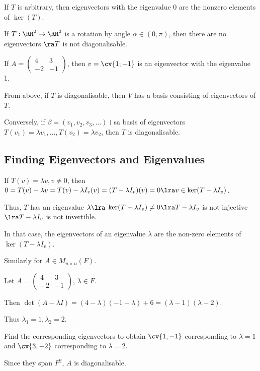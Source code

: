 \documentclass[11pt]{scrartcl}
\begin{document}
\begin{example}
  If \(T\) is arbitrary, then eigenvectors with the eigenvalue 0 are the nonzero elements of \(\ker(T)\).
\end{example}
\begin{example}
  If \(T: \RR^{2} \to \RR^{2}\) is a rotation by angle
  \(\alpha\in (0, \pi)\), then there are no eigenvectors \(\ra T\) is
  not diagonalisable.
\end{example}
\begin{example}
  If \(A = \begin{pmatrix}
    4 & 3\\
    -2 & -1
  \end{pmatrix}\), then \(v=\cv{1; -1}\) is an eigenvector with the eigenvalue 1.
\end{example}

From above, if \(T\) is diagonalisable, then \(V\) has a basis consisting of eigenvectors of \(T\).

Conversely, if \(\beta = (v_{1}, v_{2}, v_{3}, \dots)\) i sa basis of
eigenvectors
\(T(v_{1}) = \lambda v_{1}, \dots, T(v_{2}) = \lambda v_{2}\), then
\(T\) is diagonalisable.

\subsection{Finding Eigenvectors and Eigenvalues}
\label{subsec:eigf}

If \(T(v)= \lambda v, v\neq 0\), then
\(0 = T(v) - \lambda v = T(v) - \lambda I_{v}(v) = (T-\lambda
I_{v})(v) = 0 \lra v\in \ker(T-\lambda I_{v})\).

Thus, \(T\) has an eigenvalue \(\lambda \lra\)
\(\ker(T-\lambda I_{v}) \neq 0 \lra T-\lambda I_{v}\) is not injective
\(\lra T- \lambda I_{v}\) is not invertible.

In that case, the eigenvectors of an eigenvalue \(\lambda\) are the
non-zero elements of \(\ker(T-\lambda I_{v})\).

Similarly for \(A\in M_{n\times n}(F)\).

\begin{example}
  Let \(A = \begin{pmatrix}
    4 & 3\\
    -2 & -1
  \end{pmatrix}\), \(\lambda \in F\).

  Then
  \(\det(A-\lambda I) = (4 - \lambda)(-1-\lambda) + 6 =
  (\lambda-1)(\lambda - 2)\).

  Thus \(\lambda_{1} = 1, \lambda_{2} = 2\).

  Find the corresponding eigenvectors to obtain \(\cv{1, -1}\)
  corresponding to \(\lambda = 1\) and \(\cv{3, -2}\) corresponding to
  \(\lambda = 2\).

  Since they span \(F^{2}\), \(A\) is diagonalisable.
\end{example}
\end{document}
